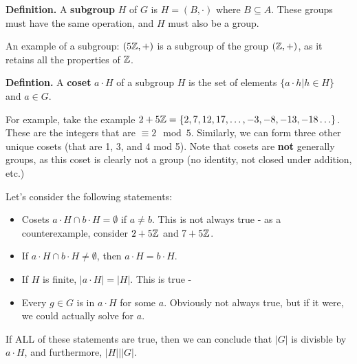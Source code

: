 \documentclass[11pt,twosided]{article}
\begin{document}
\textbf{Definition. } A \textbf{subgroup} $H$ of $G$ is $H = (B, \cdot)$ where $B \subseteq A$. These groups must have the same operation, and $H$ must also be a group. 

An example of a subgroup: $(5\mathbb Z, +)$ is a subgroup of the group $(\mathbb Z, +)$, as it retains all the properties of $\mathbb Z$. 

\textbf{Defintion. } A \textbf{coset} $a\cdot H$ of a subgroup $H$ is the set of elements $\{ a \cdot h | h \in H\}$ and $a \in G$. 

For example, take the example $2 + 5\mathbb Z = \{2, 7, 12, 17, \ldots, -3, -8, -13 ,-18 \ldots \}$. These are the integers that are $\equiv 2 \mod 5$. Similarly, we can form three other unique cosets (that are 1, 3, and 4 mod 5). Note that cosets are \textbf{not} generally groups, as this coset is clearly not a group (no identity, not closed under addition, etc.) 

Let's consider the following statements: 
\begin{itemize}
\item Cosets $a \cdot H \cap b \cdot H = \emptyset$ if $a \neq b$. This is not always true - as a counterexample, consider $2 + 5 \mathbb Z$ and $ 7 + 5 \mathbb Z$. 
\item If $a \cdot H \cap b \cdot H \neq \emptyset$, then $a\cdot H = b \cdot H$. 
\item If $H$ is finite, $|a\cdot H| = |H|$. This is true - 
\item Every $g \in G$ is in $a \cdot H$ for some $a$. Obviously not always true, but if it were, we could actually solve for $a$. 
\end{itemize}
If ALL of these statements are true, then we can conclude that $|G|$ is divisble by $a\cdot H$, and furthermore, $|H| | |G|$. 
\end{document}
